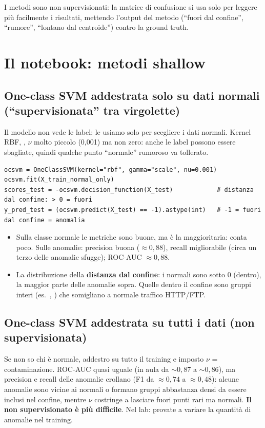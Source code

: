 \begin{attenzione}
I metodi sono non supervisionati: la matrice di confusione si usa solo per leggere più facilmente i risultati, mettendo l'output del
metodo (``fuori dal confine'', ``rumore'', ``lontano dal centroide'') contro la ground truth.
\end{attenzione}

\section{Il notebook: metodi shallow}
\subsection{One-class SVM addestrata solo su dati normali (``supervisionata'' tra virgolette)}
Il modello non vede le label: le usiamo solo per scegliere i dati normali. Kernel RBF, , $\nu$ molto piccolo
(0,001) ma non zero: anche le label possono essere sbagliate, quindi qualche punto ``normale'' rumoroso va tollerato.
\begin{lstlisting}
ocsvm = OneClassSVM(kernel="rbf", gamma="scale", nu=0.001)
ocsvm.fit(X_train_normal_only)
scores_test = -ocsvm.decision_function(X_test)            # distanza dal confine: > 0 = fuori
y_pred_test = (ocsvm.predict(X_test) == -1).astype(int)   # -1 = fuori dal confine = anomalia
\end{lstlisting}
\begin{itemize}
  \item Sulla classe normale le metriche sono buone, ma è la maggioritaria: conta poco. Sulle anomalie: precision buona ($\approx 0{,}88$),
        recall migliorabile (circa un terzo delle anomalie sfugge); ROC-AUC $\approx 0{,}88$.
  \item La distribuzione della \textbf{distanza dal confine}: i normali sono sotto 0 (dentro), la maggior parte delle anomalie sopra.
        Quelle dentro il confine sono gruppi interi (es.\ , ) che somigliano a normale traffico HTTP/FTP.
\end{itemize}

\subsection{One-class SVM addestrata su tutti i dati (non supervisionata)}
Se non so chi è normale, addestro su tutto il training e imposto $\nu$ = contaminazione. ROC-AUC quasi uguale (in aula da $\sim0{,}87$
a $\sim0{,}86$), ma precision e recall delle anomalie crollano (F1 da $\approx 0{,}74$ a $\approx 0{,}48$): alcune anomalie sono vicine ai
normali o formano gruppi abbastanza densi da essere inclusi nel confine, mentre $\nu$ costringe a lasciare fuori punti rari ma normali.
\textbf{Il non supervisionato è più difficile}. Nel lab: provate a variare la quantità di anomalie nel training.

